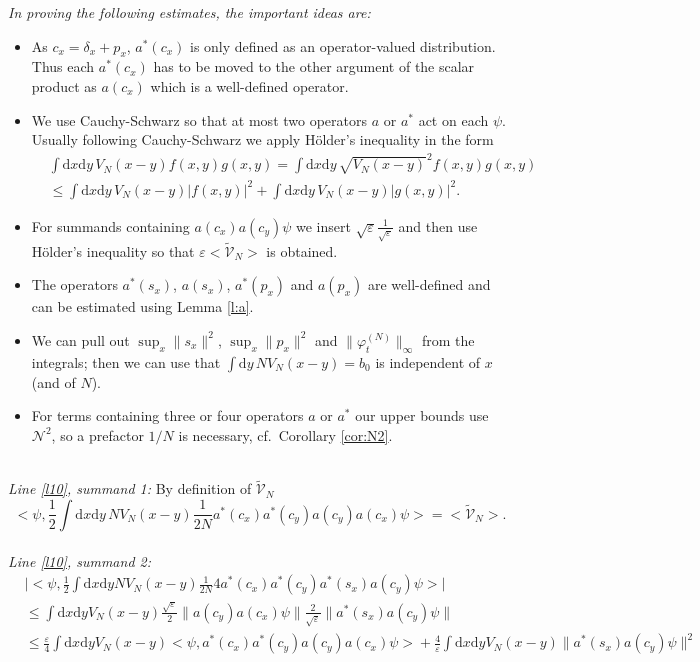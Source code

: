 \documentclass[11pt,a4paper,draft,DIV11]{scrartcl}	%
\newcommand{\di}{\textrm{d}}		%
\newcommand{\Ncal}{\mathcal{N}}		%
\newcommand{\tilV}{\tilde{\mathcal{V}}_N}		%
\newcommand{\estlist}[2]{\emph{\vspace{.3em}\\Line \ref{l#1}, summand #2:}}
\newcommand{\scal}[2]{\big<#1,#2\big>} %
\newcommand{\norm}[1]{\lVert#1\rVert}	%
\newcommand{\ev}[1]{\big<#1\big>}	%
\newcommand{\ph}{\varphi_t^{(N)}}	%
\newcommand{\dxyNV}{\frac{1}{2}\int \di x\di y N V_N(x-y)} %
\newcommand{\bd}{\begin{displaymath}}			%
\newcommand{\ed}{\end{displaymath}}
\begin{document}
\begin{fleqn}[0.5em]
\emph{In proving the following estimates, the important ideas are:}
\begin{itemize}
 \item As $c_x = \delta_x + p_x$, $a^*(c_x)$ is only defined as an operator-valued distribution. Thus each $a^\ast(c_x)$ has to be moved to the other argument of the scalar product as $a(c_x)$ which is a well-defined operator.
\item We use Cauchy-Schwarz so that at most two operators $a$ or $a^\ast$ act on each $\psi$. Usually following Cauchy-Schwarz we apply H\"older's inequality in the form
\bd
\begin{split}
& \int \di x \di y\, V_N(x-y) f(x,y) g(x,y) = \int \di x \di y\, \sqrt{V_N(x-y)}^2 f(x,y) g(x,y)\\
&  \leq \int \di x\di y\, V_N(x-y) \lvert f(x,y)\rvert^2 + \int \di x\di y\, V_N(x-y) \lvert g(x,y)\rvert^2.
\end{split}
\ed
 \item For summands containing $a(c_x) a(c_y) \psi$ we insert $\sqrt{\varepsilon} \frac{1}{\sqrt{\varepsilon}}$ and then use H\"older's inequality so that $\varepsilon\ev{\tilV}$ is obtained.
 \item The operators $a^\ast(s_x)$, $a(s_x)$, $a^\ast(p_x)$ and $a(p_x)$ are well-defined and can be estimated using Lemma \ref{l:a}.
 \item We can pull out $\sup_x \norm{s_x}^2$, $\sup_x \norm{p_x}^2$ and $\norm{\ph}_\infty$ from the integrals; then we can use that $\int \di y\, NV_N(x-y) = b_0$ is independent of $x$ (and of $N$).
\item For terms containing three or four operators $a$ or $a^\ast$ our upper bounds use $\Ncal^2$, so a prefactor $1/N$ is necessary, cf.\ Corollary \ref{cor:N2}. 
\end{itemize}
%
\estlist{10}{1}
By definition of $\tilV$
\bd
\scal{\psi}{\frac{1}{2}\int \di x\di y\, NV_N(x-y)\frac{1}{2N} a^\ast(c_x) a^\ast(c_y) a(c_y) a(c_x)\psi} = \ev{\tilV}.
\ed
\estlist{10}{2}
\begin{align*}
 & \lvert \scal{\psi}{\dxyNV \frac{1}{2N} 4 a^\ast(c_x)a^\ast(c_y) a^\ast(s_x)a(c_y)\psi}\rvert \\
& \leq \int \di x\di y V_N(x-y) \frac{\sqrt{\varepsilon}}{2} \norm{a(c_y) a(c_x)\psi} \frac{2}{\sqrt{\varepsilon}} \norm{a^\ast(s_x)a(c_y)\psi} \\
& \leq \frac{\varepsilon}{4} \int \di x\di y V_N(x-y) \scal{\psi}{a^\ast(c_x)a^\ast(c_y)a(c_y)a(c_x)\psi} + \frac{4}{\varepsilon} \int \di x\di y V_N(x-y) \norm{a^\ast(s_x)a(c_y)\psi}^2 \\

\end{align*}
\end{fleqn}
\end{document}
